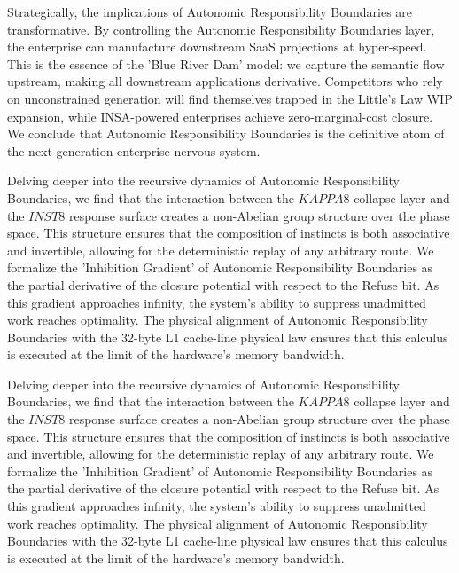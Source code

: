 \documentclass[12pt,a4paper,oneside]{book}
\begin{document}
Strategically, the implications of Autonomic Responsibility Boundaries are transformative. By controlling the Autonomic Responsibility Boundaries layer, the enterprise can manufacture downstream SaaS projections at hyper-speed. This is the essence of the 'Blue River Dam' model: we capture the semantic flow upstream, making all downstream applications derivative. Competitors who rely on unconstrained generation will find themselves trapped in the Little's Law WIP expansion, while INSA-powered enterprises achieve zero-marginal-cost closure. We conclude that Autonomic Responsibility Boundaries is the definitive atom of the next-generation enterprise nervous system. 

Delving deeper into the recursive dynamics of Autonomic Responsibility Boundaries, we find that the interaction between the $KAPPA8$ collapse layer and the $INST8$ response surface creates a non-Abelian group structure over the phase space. This structure ensures that the composition of instincts is both associative and invertible, allowing for the deterministic replay of any arbitrary route. We formalize the 'Inhibition Gradient' of Autonomic Responsibility Boundaries as the partial derivative of the closure potential with respect to the Refuse bit. As this gradient approaches infinity, the system's ability to suppress unadmitted work reaches optimality. The physical alignment of Autonomic Responsibility Boundaries with the 32-byte L1 cache-line physical law ensures that this calculus is executed at the limit of the hardware's memory bandwidth. 

Delving deeper into the recursive dynamics of Autonomic Responsibility Boundaries, we find that the interaction between the $KAPPA8$ collapse layer and the $INST8$ response surface creates a non-Abelian group structure over the phase space. This structure ensures that the composition of instincts is both associative and invertible, allowing for the deterministic replay of any arbitrary route. We formalize the 'Inhibition Gradient' of Autonomic Responsibility Boundaries as the partial derivative of the closure potential with respect to the Refuse bit. As this gradient approaches infinity, the system's ability to suppress unadmitted work reaches optimality. The physical alignment of Autonomic Responsibility Boundaries with the 32-byte L1 cache-line physical law ensures that this calculus is executed at the limit of the hardware's memory bandwidth. 
\end{document}
